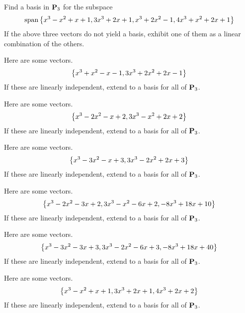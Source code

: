 \begin{ex}
  Find a basis in $\mathbf{P}_{3}$ for the subspace
  \begin{equation*}
    \sspan\set{
      x^{3}-x^{2}+x+1,3x^{3}+2x+1,x^{3}+2x^{2}-1,4x^{3}+x^{2}+2x+1}
  \end{equation*}
  If the above three vectors do not yield a basis, exhibit one
  of them as a linear combination of the others.
\end{ex}

\begin{ex}
  Here are some vectors.
  \begin{equation*}
    \left\{x^{3}+x^{2}-x-1,3x^{3}+2x^{2}+2x-1\right\}
  \end{equation*}
  If these are linearly independent, extend to a basis for all of $\mathbf{P}_{3}$.
\end{ex}

\begin{ex}
  Here are some vectors.
  \begin{equation*}
    \left\{x^{3}-2x^{2}-x+2,3x^{3}-x^{2}+2x+2\right\}
  \end{equation*}
  If these are linearly independent, extend to a basis for all of $\mathbf{P}_{3}$.
\end{ex}

\begin{ex}
  Here are some vectors.
  \begin{equation*}
    \left\{x^{3}-3x^{2}-x+3,3x^{3}-2x^{2}+2x+3\right\}
  \end{equation*}
  If these are linearly independent, extend to a basis for all of $\mathbf{P}_{3}$.
\end{ex}

\begin{ex}
  Here are some vectors.
  \begin{equation*}
    \left\{x^{3}-2x^{2}-3x+2,3x^{3}-x^{2}-6x+2,-8x^{3}+18x+10\right\}
  \end{equation*}
  If these are linearly independent, extend to a basis for all of $\mathbf{P}_{3}$.
\end{ex}

\begin{ex}
  Here are some vectors.
  \begin{equation*}
    \left\{x^{3}-3x^{2}-3x+3,3x^{3}-2x^{2}-6x+3,-8x^{3}+18x+40\right\}
  \end{equation*}
  If these are linearly independent, extend to a basis for all of $\mathbf{P}_{3}$.
\end{ex}

\begin{ex}
  Here are some vectors.
  \begin{equation*}
    \left\{x^{3}-x^{2}+x+1,3x^{3}+2x+1,4x^{3}+2x+2\right\}
  \end{equation*}
  If these are linearly independent, extend to a basis for all of $\mathbf{P}_{3}$.
\end{ex}

